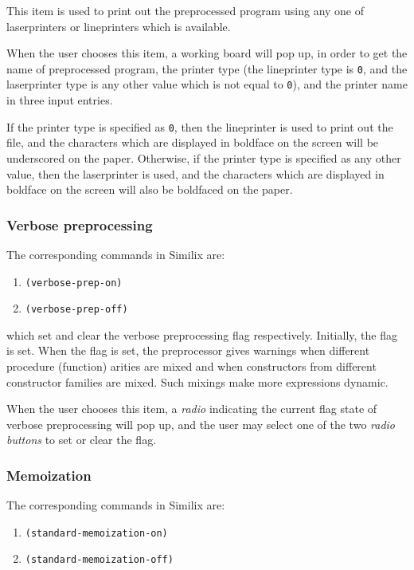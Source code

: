 \begin{sloppypar}
This item is used to print out the preprocessed program using any one
of laserprinters or lineprinters which is available.

When the user chooses this item, a working board will pop up, in order
to get the name of preprocessed program, the printer type (the
lineprinter type is {\tt 0}, and the laserprinter type is any other
value which is not equal to {\tt 0}), and the printer name in three
input entries.

If the printer type is specified as {\tt 0}, then the lineprinter is
used to print out the file, and the characters which are displayed in
boldface on the screen will be underscored on the paper.  Otherwise,
if the printer type is specified as any other value, then the
laserprinter is used, and the characters which are displayed in
boldface on the screen will also be boldfaced on the paper.



\subsubsection{Verbose preprocessing}
\label{subsubsec-verb-pre-prog}

The corresponding commands in Similix are:

\begin{enumerate}
\item {\tt (verbose-prep-on)}
\item {\tt (verbose-prep-off)}
\end{enumerate}

\noindent which set and clear the verbose preprocessing flag respectively.
Initially, the flag is set. When the flag is set, the preprocessor
gives warnings when different procedure (function) arities are mixed
and when constructors from different constructor families are
mixed. Such mixings make more expressions dynamic.

When the user chooses this item, a {\it radio} indicating the current
flag state of verbose preprocessing will pop up, and the user may
select one of the two {\it radio buttons} to set or clear the flag.


\subsubsection{Memoization}
\label{subsubsec-memo}

The corresponding commands in Similix are:

\begin{enumerate}
\item {\tt (standard-memoization-on)}
\item {\tt (standard-memoization-off)}
\end{enumerate}


\end{sloppypar}
